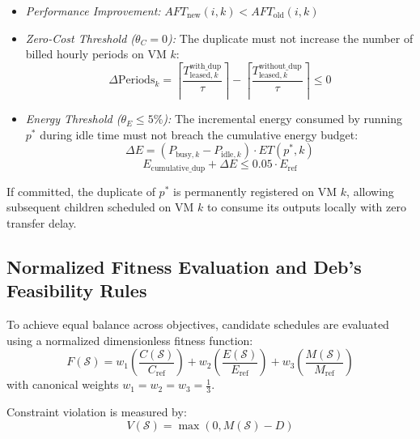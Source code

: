 \documentclass[journal]{IEEEtran}
\begin{document}
\begin{enumerate}
    \begin{itemize}
        \item \textit{Performance Improvement:} $AFT_{\text{new}}(i, k) < AFT_{\text{old}}(i, k)$
        \item \textit{Zero-Cost Threshold ($\theta_C = 0$):} The duplicate must not increase the number of billed hourly periods on VM $k$:
        \begin{equation}
        \Delta \text{Periods}_k = \left\lceil \frac{T_{\text{leased},k}^{\text{with\_dup}}}{\tau} \right\rceil - \left\lceil \frac{T_{\text{leased},k}^{\text{without\_dup}}}{\tau} \right\rceil \le 0
        \label{eq:zero_cost}
        \end{equation}
        \item \textit{Energy Threshold ($\theta_E \le 5\%$):} The incremental energy consumed by running $p^*$ during idle time must not breach the cumulative energy budget:
        \begin{equation}
        \Delta E = (P_{\text{busy},k} - P_{\text{idle},k}) \cdot ET(p^*, k)
        \label{eq:delta_e}
        \end{equation}
        \begin{equation}
        E_{\text{cumulative\_dup}} + \Delta E \le 0.05 \cdot E_{\text{ref}}
        \label{eq:energy_cap}
        \end{equation}
    \end{itemize}
\end{enumerate}

If committed, the duplicate of $p^*$ is permanently registered on VM $k$, allowing subsequent children scheduled on VM $k$ to consume its outputs locally with zero transfer delay.

\subsection{Normalized Fitness Evaluation and Deb's Feasibility Rules}
To achieve equal balance across objectives, candidate schedules are evaluated using a normalized dimensionless fitness function:
\begin{equation}
F(\mathcal{S}) = w_1 \left( \frac{C(\mathcal{S})}{C_{\text{ref}}} \right) + w_2 \left( \frac{E(\mathcal{S})}{E_{\text{ref}}} \right) + w_3 \left( \frac{M(\mathcal{S})}{M_{\text{ref}}} \right)
\label{eq:fitness}
\end{equation}
with canonical weights $w_1 = w_2 = w_3 = \frac{1}{3}$.

Constraint violation is measured by:
\begin{equation}
V(\mathcal{S}) = \max(0, M(\mathcal{S}) - D)
\label{eq:violation}
\end{equation}
\end{document}
